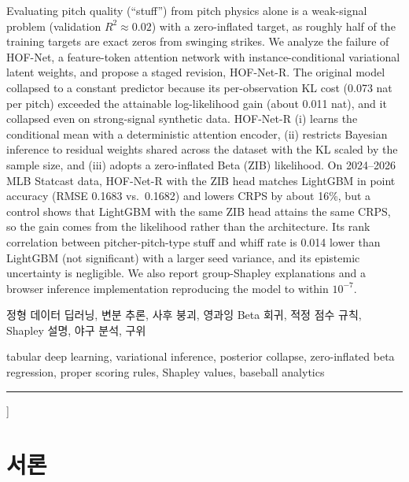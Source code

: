 \documentclass[journal,a4paper,10pt]{IEEEtran}
\begin{document}
{\begin{minipage}{\textwidth}
\vspace{5pt}
\quad
Evaluating pitch quality (``stuff'') from pitch physics alone is a weak-signal problem (validation $R^2\approx0.02$) with a zero-inflated target, as roughly half of the training targets are exact zeros from swinging strikes. We analyze the failure of HOF-Net, a feature-token attention network with instance-conditional variational latent weights, and propose a staged revision, HOF-Net-R. The original model collapsed to a constant predictor because its per-observation KL cost (0.073 nat per pitch) exceeded the attainable log-likelihood gain (about 0.011 nat), and it collapsed even on strong-signal synthetic data. HOF-Net-R (i) learns the conditional mean with a deterministic attention encoder, (ii) restricts Bayesian inference to residual weights shared across the dataset with the KL scaled by the sample size, and (iii) adopts a zero-inflated Beta (ZIB) likelihood. On 2024–2026 MLB Statcast data, HOF-Net-R with the ZIB head matches LightGBM in point accuracy (RMSE 0.1683 vs.\ 0.1682) and lowers CRPS by about 16\%, but a control shows that LightGBM with the same ZIB head attains the same CRPS, so the gain comes from the likelihood rather than the architecture. Its rank correlation between pitcher-pitch-type stuff and whiff rate is 0.014 lower than LightGBM (not significant) with a larger seed variance, and its epistemic uncertainty is negligible. We also report group-Shapley explanations and a browser inference implementation reproducing the model to within $10^{-7}$.

\vspace{5pt}
\quad 정형 데이터 딥러닝, 변분 추론, 사후 붕괴, 영과잉 Beta 회귀, 적정 점수 규칙, Shapley 설명, 야구 분석, 구위\par
{}\quad tabular deep learning, variational inference, posterior collapse, zero-inflated beta regression, proper scoring rules, Shapley values, baseball analytics
\end{minipage}
\par\vspace{4pt}\noindent\rule{\textwidth}{0.4pt}\par\vspace{12pt}
}]

\section{서론}
\label{sec:intro}
\end{document}
